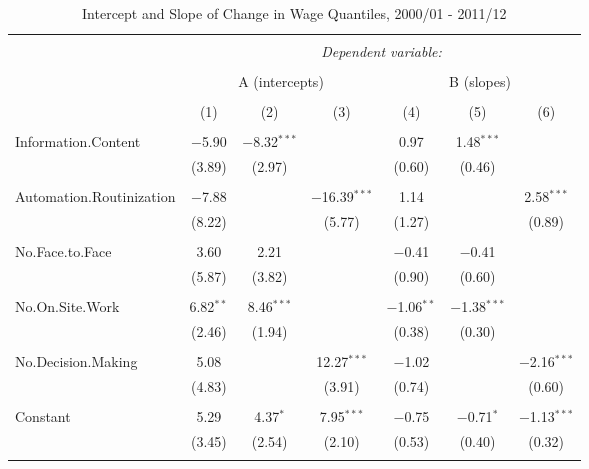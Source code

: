 \documentclass{article}
\begin{document}
\begin{table}[!htbp] \centering 
  \caption{Intercept and Slope of Change in Wage Quantiles, 2000/01 - 2011/12} 
  \label{} 
\begin{tabular}{@{\extracolsep{5pt}}lcccccc} 
\\[-1.8ex]\hline 
\hline \\[-1.8ex] 
 & \multicolumn{6}{c}{\textit{Dependent variable:}} \\ 
\cline{2-7} 
\\[-1.8ex] & \multicolumn{3}{c}{A (intercepts)} & \multicolumn{3}{c}{B (slopes)} \\ 
\\[-1.8ex] & (1) & (2) & (3) & (4) & (5) & (6)\\ 
\hline \\[-1.8ex] 
 Information.Content & $-$5.90 & $-$8.32$^{***}$ &  & 0.97 & 1.48$^{***}$ &  \\ 
  & (3.89) & (2.97) &  & (0.60) & (0.46) &  \\ 
  & & & & & & \\ 
 Automation.Routinization & $-$7.88 &  & $-$16.39$^{***}$ & 1.14 &  & 2.58$^{***}$ \\ 
  & (8.22) &  & (5.77) & (1.27) &  & (0.89) \\ 
  & & & & & & \\ 
 No.Face.to.Face & 3.60 & 2.21 &  & $-$0.41 & $-$0.41 &  \\ 
  & (5.87) & (3.82) &  & (0.90) & (0.60) &  \\ 
  & & & & & & \\ 
 No.On.Site.Work & 6.82$^{**}$ & 8.46$^{***}$ &  & $-$1.06$^{**}$ & $-$1.38$^{***}$ &  \\ 
  & (2.46) & (1.94) &  & (0.38) & (0.30) &  \\ 
  & & & & & & \\ 
 No.Decision.Making & 5.08 &  & 12.27$^{***}$ & $-$1.02 &  & $-$2.16$^{***}$ \\ 
  & (4.83) &  & (3.91) & (0.74) &  & (0.60) \\ 
  & & & & & & \\ 
 Constant & 5.29 & 4.37$^{*}$ & 7.95$^{***}$ & $-$0.75 & $-$0.71$^{*}$ & $-$1.13$^{***}$ \\ 
  & (3.45) & (2.54) & (2.10) & (0.53) & (0.40) & (0.32) \\ 
  & & & & & & \\ 

\end{tabular}
\end{table}
\end{document}
